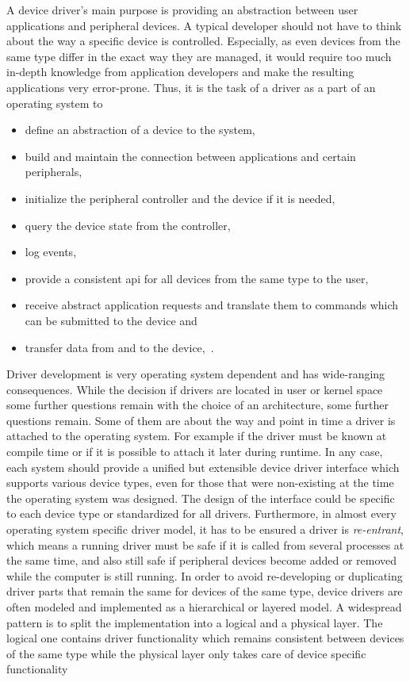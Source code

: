 A device driver's main purpose is providing an abstraction between user applications and peripheral devices\cite{glatz2015betriebssysteme}.
A typical developer should not have to think about the way a specific device is controlled.
Especially, as even devices from the same type differ in the exact way they are managed, it would require too much in-depth knowledge from application developers and make the resulting applications very error-prone.
Thus, it is the task of a driver as a part of an operating system to 
\begin{itemize}
    \item define an abstraction of a device to the system,
    \item build and maintain the connection between applications and certain peripherals, 
    \item initialize the peripheral controller and the device if it is needed,
    \item query the device state from the controller,
    \item log events,
    \item provide a consistent \ac{api} for all devices from the same type to the user,
    \item receive abstract application requests and translate them to commands which can be submitted to the device and
    \item transfer data from and to the device\cite{glatz2015betriebssysteme},~\cite{tanenbaum-modern-operating-systems}.
\end{itemize}
%
Driver development is very operating system dependent and has wide-ranging consequences.
While the decision if drivers are located in user or kernel space some further questions remain with the choice of an architecture, some further questions remain.
Some of them are about the way and point in time a driver is attached to the operating system.
For example if the driver must be known at compile time or if it is possible to attach it later during runtime\cite{tanenbaum-modern-operating-systems}.
In any case, each system should provide a unified but extensible device driver interface which supports various device types, even for those that were non-existing at the time the operating system was designed\cite{glatz2015betriebssysteme}.
The design of the interface could be specific to each device type or standardized for all drivers\cite{tanenbaum-modern-operating-systems}.
Furthermore, in almost every operating system specific driver model, it has to be ensured a driver is \textit{re-entrant}, which means a running driver must be safe if it is called from several processes at the same time, and also still safe if peripheral devices become added or removed while the computer is still running\cite{tanenbaum-modern-operating-systems}.
In order to avoid re-developing or duplicating driver parts that remain the same for devices of the same type, device drivers are often modeled and implemented as a hierarchical or layered model.
A widespread pattern is to split the implementation into a logical and a physical layer.
The logical one contains driver functionality which remains consistent between devices of the same type while the physical layer only takes care of device specific functionality\cite{tanenbaum-modern-operating-systems} 

